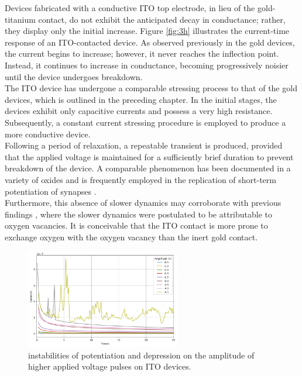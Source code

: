 \noindent Devices fabricated with a conductive ITO top electrode, in lieu of the gold-titanium contact, do not exhibit the anticipated decay in conductance; rather, they display only the initial increase. Figure \ref{fig:3h} illustrates the current-time response of an ITO-contacted device. As observed previously in the gold devices, the current begins to increase; however, it never reaches the inflection point. Instead, it continues to increase in conductance, becoming progressively noisier until the device undergoes breakdown.\\

\noindent The ITO device has undergone a comparable stressing process to that of the gold devices, which is outlined in the preceding chapter. In the initial stages, the devices exhibit only capacitive currents and possess a very high resistance. Subsequently, a constant current stressing procedure is employed to produce a more conductive device. \\

\noindent Following a period of relaxation, a repeatable transient is produced, provided that the applied voltage is maintained for a sufficiently brief duration to prevent breakdown of the device. A comparable phenomenon has been documented \cite{moon2019rram} in a variety of oxides and is frequently employed in the replication of short-term potentiation of synapses \cite{zhang2017emulating, chang2011short}.\\

\noindent Furthermore, this absence of slower dynamics may corroborate with previous findings \cite{meyer2005oxygen}, where the slower dynamics were postulated to be attributable to oxygen vacancies. It is conceivable that the ITO contact is more prone to exchange oxygen with the oxygen vacancy than the inert gold contact. \\

\begin{figure}[htbp!] 
    \centering    
    \includegraphics[width=0.6\textwidth]{Chapter5/Figs/c.png}
    \caption[instabilities of potentiation and depression on the amplitude of applied voltage pulses.]{instabilities of potentiation and depression on the amplitude of higher applied voltage pulses on ITO devices.}
    \label{fig:5c}
\end{figure}

